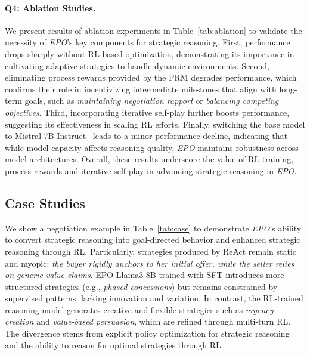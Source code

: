 \paragraph{\textbf{Q4: Ablation Studies.}}
\label{sec:ablation}
We present results of ablation experiments in Table~\ref{tab:ablation} to validate the necessity of \textit{EPO}'s key components for strategic reasoning.
First, performance drops sharply without RL-based optimization, demonstrating its importance in cultivating adaptive strategies to handle dynamic environments.
Second, eliminating process rewards provided by the PRM degrades performance, which confirms their role in incentivizing intermediate milestones that align with long-term goals, such as \textit{maintaining negotiation rapport} or \textit{balancing competing objectives}.
Third, incorporating iterative self-play further boosts performance, suggesting its effectiveness in scaling RL efforts.
Finally, switching the base model to Mistral-7B-Instruct~\cite{jiang2023mistral} leads to a minor performance decline, indicating that while model capacity affects reasoning quality, \textit{EPO} maintains robustness across model architectures. 
Overall, these results underscore the value of RL training, process rewards and iterative self-play in advancing strategic reasoning in \textit{EPO}.


\subsection{Case Studies}
We show a negotiation example in Table~\ref{tab:case} to demonstrate \textit{EPO}'s ability to convert strategic reasoning into goal-directed behavior and enhanced strategic reasoning through RL.
Particularly, strategies produced by ReAct remain static and myopic: \textit{the buyer rigidly anchors to her initial offer, while the seller relies on generic value claims}.
EPO-Llama3-8B trained with SFT introduces more structured strategies (e.g., \textit{phased concessions}) but remains constrained by supervised patterns, lacking innovation and variation. 
In contrast, the RL-trained reasoning model generates creative and flexible strategies such as \textit{urgency creation} and \textit{value-based persuasion}, which are refined through multi-turn RL.
The divergence stems from explicit policy optimization for strategic reasoning and the ability to reason for optimal strategies through RL.



 

